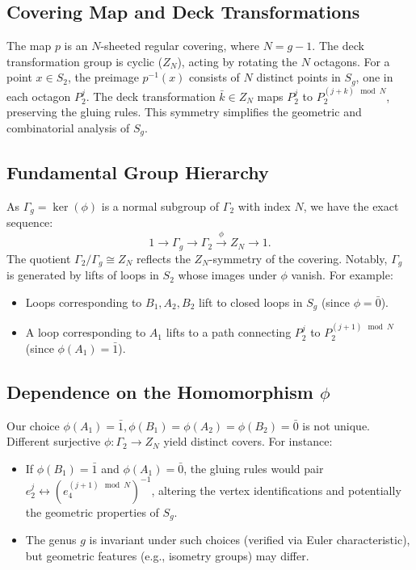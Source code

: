 \documentclass{article}
\theoremstyle{definition}
\theoremstyle{remark}
\begin{document}
\subsection{Covering Map and Deck Transformations}
The map \(p\) is an \(N\)-sheeted regular covering, where \(N = g-1\). The deck transformation group is cyclic (\(Z_N\)), acting by rotating the \(N\) octagons. For a point \(x \in S_2\), the preimage \(p^{-1}(x)\) consists of \(N\) distinct points in \(S_g\), one in each octagon \(P_2^j\). The deck transformation \(\bar{k} \in Z_N\) maps \(P_2^j\) to \(P_2^{(j+k) \mod N}\), preserving the gluing rules. This symmetry simplifies the geometric and combinatorial analysis of \(S_g\).

\subsection{Fundamental Group Hierarchy}
As \(\Gamma_g = \ker(\phi)\) is a normal subgroup of \(\Gamma_2\) with index \(N\), we have the exact sequence:
\[
1 \to \Gamma_g \to \Gamma_2 \xrightarrow{\phi} Z_N \to 1.
\]
The quotient \(\Gamma_2 / \Gamma_g \cong Z_N\) reflects the \(Z_N\)-symmetry of the covering. Notably, \(\Gamma_g\) is generated by lifts of loops in \(S_2\) whose images under \(\phi\) vanish. For example:
\begin{itemize}
    \item Loops corresponding to \(B_1, A_2, B_2\) lift to closed loops in \(S_g\) (since \(\phi = \bar{0}\)).
    \item A loop corresponding to \(A_1\) lifts to a path connecting \(P_2^j\) to \(P_2^{(j+1) \mod N}\) (since \(\phi(A_1) = \bar{1}\)).
\end{itemize}

\subsection{Dependence on the Homomorphism \(\phi\)}
Our choice \(\phi(A_1) = \bar{1}, \phi(B_1) = \phi(A_2) = \phi(B_2) = \bar{0}\) is not unique. Different surjective \(\phi: \Gamma_2 \to Z_N\) yield distinct covers. For instance:
\begin{itemize}
    \item If \(\phi(B_1) = \bar{1}\) and \(\phi(A_1) = \bar{0}\), the gluing rules would pair \(e_2^j \leftrightarrow (e_4^{(j+1) \mod N})^{-1}\), altering the vertex identifications and potentially the geometric properties of \(S_g\).
    \item The genus \(g\) is invariant under such choices (verified via Euler characteristic), but geometric features (e.g., isometry groups) may differ.
\end{itemize}
\end{document}

